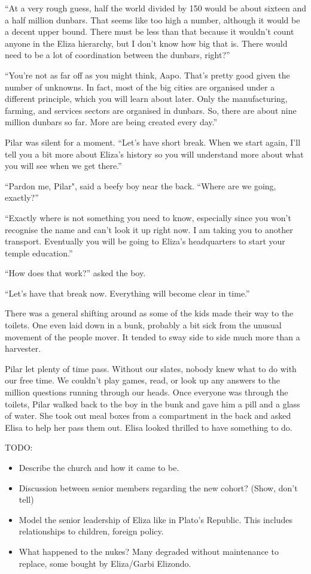 ``At a very rough guess, half the world divided by 150 would be about sixteen and a half million dunbars. That seems like too high a number, although it would be a decent upper bound. There must be less than that because it wouldn't count anyone in the Eliza hierarchy, but I don't know how big that is. There would need to be a lot of coordination between the dunbars, right?''

``You're not as far off as you might think, Aapo. That's pretty good given the number of unknowns. In fact, most of the big cities are organised under a different principle, which you will learn about later. Only the manufacturing, farming, and services sectors are organised in dunbars. So, there are about nine million dunbars so far. More are being created every day.''

Pilar was silent for a moment. ``Let's have short break. When we start again, I'll tell you a bit more about Eliza's history so you will understand more about what you will see when we get there.''

``Pardon me, Pilar", said a beefy boy near the back. ``Where are we going, exactly?''

``Exactly where is not something you need to know, especially since you won't recognise the name and can't look it up right now. I am taking you to another transport. Eventually you will be going to Eliza's headquarters to start your temple education.''

``How does that work?'' asked the boy.

``Let's have that break now. Everything will become clear in time.''

There was a general shifting around as some of the kids made their way to the toilets. One even laid down in a bunk, probably a bit sick from the unusual movement of the people mover. It tended to sway side to side much more than a harvester.

Pilar let plenty of time pass. Without our slates, nobody knew what to do with our free time. We couldn't play games, read, or look up any answers to the million questions running through our heads. Once everyone was through the toilets, Pilar walked back to the boy in the bunk and gave him a pill and a glass of water. She took out meal boxes from a compartment in the back and asked Elisa to help her pass them out. Elisa looked thrilled to have something to do.

TODO:

\begin{itemize}
\item Describe the church and how it came to be.
\item Discussion between senior members regarding the new cohort? (Show, don't tell)
\item Model the senior leadership of Eliza like in Plato's Republic. This includes relationships to children, foreign policy.
\item What happened to the nukes? Many degraded without maintenance to replace, some bought by Eliza/Garbi Elizondo.
\end{itemize}

\newpage
\thispagestyle{empty}
